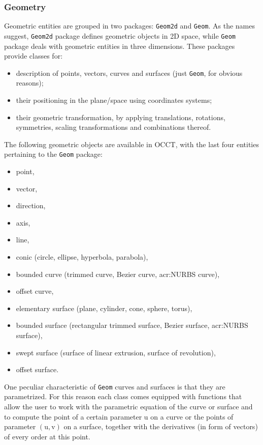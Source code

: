 \subsubsection{Geometry}

Geometric entities are grouped in two packages: \lstinline[language=Java]!Geom2d! and \lstinline[language=Java]!Geom!. As the names suggest, \lstinline[language=Java]!Geom2d! package defines geometric objects in 2D space, while \lstinline[language=Java]!Geom! package deals with geometric entities in three dimensions. These packages provide classes for:
%
\begin{itemize}
\renewcommand\labelitemi{$\bullet$}
\item description of points, vectors, curves and surfaces (just \lstinline[language=Java]!Geom!, for obvious reasons);
\item their positioning in the plane/space using coordinates systems;
\item their geometric transformation, by applying translations, rotations, symmetries, scaling transformations and combinations thereof.
\end{itemize}
%
The following geometric objects are available in \gls{OCCT}, with the last four entities pertaining to the \lstinline[language=Java]!Geom! package:
%
\begin{itemize}
\renewcommand\labelitemi{$\bullet$}
\item point,
\item vector,
\item direction,
\item axis,
\item line,
\item conic (circle, ellipse, hyperbola, parabola),
\item bounded curve (trimmed curve, Bezier curve, \gls{acr:NURBS} curve),
\item offset curve,
\item elementary surface (plane, cylinder, cone, sphere, torus),
\item bounded surface (rectangular trimmed surface, Bezier surface, \gls{acr:NURBS} surface),
\item swept surface (surface of linear extrusion, surface of revolution),
\item offset surface.
\end{itemize}
%
One peculiar characteristic of \lstinline[language=Java]!Geom! curves and surfaces is that they are parametrized. For this reason each class comes equipped with functions that allow the user to work with the parametric equation of the curve or surface and to compute the point of a certain parameter u on a curve or the points of parameter $(\text{u}, \text{v})$ on a surface, together with the derivatives (in form of vectors) of every order at this point.


